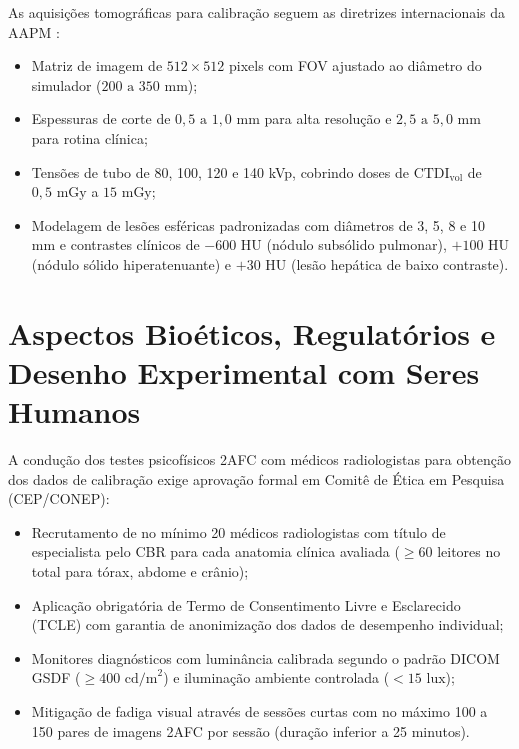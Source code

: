 As aquisições tomográficas para calibração seguem as diretrizes internacionais da AAPM \cite{aapm_tg233_2019}:
\begin{itemize}
  \item Matriz de imagem de $512 \times 512$ pixels com FOV ajustado ao diâmetro do simulador ($200 \text{ a } 350 \text{ mm}$);
  \item Espessuras de corte de $0{,}5 \text{ a } 1{,}0 \text{ mm}$ para alta resolução e $2{,}5 \text{ a } 5{,}0 \text{ mm}$ para rotina clínica;
  \item Tensões de tubo de 80, 100, 120 e 140 kVp, cobrindo doses de $\text{CTDI}_{\text{vol}}$ de $0{,}5 \text{ mGy}$ a $15 \text{ mGy}$;
  \item Modelagem de lesões esféricas padronizadas com diâmetros de 3, 5, 8 e 10 mm e contrastes clínicos de $-600 \text{ HU}$ (nódulo subsólido pulmonar), $+100 \text{ HU}$ (nódulo sólido hiperatenuante) e $+30 \text{ HU}$ (lesão hepática de baixo contraste).
\end{itemize}

\section{Aspectos Bioéticos, Regulatórios e Desenho Experimental com Seres Humanos}
\label{sec:bioetica}

A condução dos testes psicofísicos 2AFC com médicos radiologistas para obtenção dos dados de calibração exige aprovação formal em Comitê de Ética em Pesquisa (CEP/CONEP):
\begin{itemize}
  \item Recrutamento de no mínimo 20 médicos radiologistas com título de especialista pelo CBR para cada anatomia clínica avaliada ($\ge 60$ leitores no total para tórax, abdome e crânio);
  \item Aplicação obrigatória de Termo de Consentimento Livre e Esclarecido (TCLE) com garantia de anonimização dos dados de desempenho individual;
  \item Monitores diagnósticos com luminância calibrada segundo o padrão DICOM GSDF ($\ge 400 \text{ cd/m}^2$) e iluminação ambiente controlada ($< 15 \text{ lux}$);
  \item Mitigação de fadiga visual através de sessões curtas com no máximo 100 a 150 pares de imagens 2AFC por sessão (duração inferior a 25 minutos).
\end{itemize}
